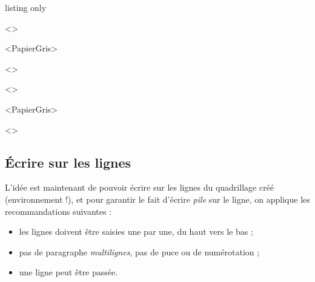 \documentclass[a4paper]{article}
\begin{document}
\begin{PresentationCode}{listing only}

\begin{EnvQuadrillage}[NbCarreaux=18x4,Grille=Seyes,Marge=3]<\CoulSeyes>
\end{EnvQuadrillage}

\begin{EnvQuadrillage}[NbCarreaux=36x8,Elargir=3/3]<PapierGris>
\end{EnvQuadrillage}

\begin{center}
	\begin{EnvQuadrillage}[NbCarreaux=12x3,Elargir=2/2,Grille=Ruled,Marge=2]<\CoulRuled>
	\end{EnvQuadrillage}
\end{center}
\end{PresentationCode}

\medskip

\begin{EnvQuadrillage}[NbCarreaux=18x4,Grille=Seyes,Marge=3]<\CoulSeyes>
\end{EnvQuadrillage}

\smallskip

\begin{EnvQuadrillage}[NbCarreaux=36x8,Elargir=3/3,Cadre]<PapierGris>
\end{EnvQuadrillage}

\begin{center}
	\begin{EnvQuadrillage}[NbCarreaux=12x3,Grille=Ruled,Marge=2]<\CoulRuled>
\end{EnvQuadrillage}
\end{center}

\pagebreak

\subsection{Écrire sur les lignes}

L'idée est maintenant de pouvoir écrire sur les lignes du quadrillage créé (environnement !), et pour garantir le fait d'écrire \textit{pile} sur le ligne, on applique les recommandations suivantes :

\begin{itemize}
	\item les lignes doivent être saisies une par une, du \og haut \fg{} vers le \og bas \fg{} ;
	\item pas de paragraphe \textit{multilignes}, pas de puce ou de numérotation ;
	\item une ligne peut être passée.
\end{itemize}
\end{document}

